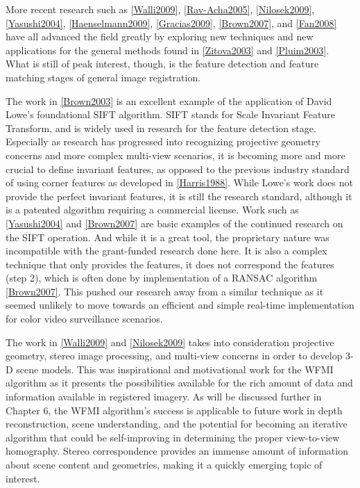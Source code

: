  More recent research such as \ref{Walli2009}, \ref{Rav-Acha2005}, \ref{Nilosek2009}, \ref{Yasushi2004}, \ref{Haenselmann2009}, \ref{Gracias2009}, \ref{Brown2007}, and \ref{Fan2008} have all advanced the field greatly by exploring new techniques and new applications for the general methods found in \ref{Zitova2003} and \ref{Pluim2003}. What is still of peak interest, though, is the feature detection and feature matching stages of general image registration.
 
  The work in \ref{Brown2003} is an excellent example of the application of David Lowe's foundational SIFT algorithm. SIFT stands for Scale Invariant Feature Transform, and is widely used in research for the feature detection stage. Especially as research has progressed into recognizing projective geometry concerns and more complex multi-view scenarios, it is becoming more and more crucial to define invariant features, as opposed to the previous industry standard of using corner features as developed in \ref{Harris1988}. While Lowe's work does not provide the perfect invariant features, it is still the research standard, although it is a patented algorithm requiring a commercial license. Work such as \ref{Yasushi2004} and \ref{Brown2007} are basic examples of the continued research on the SIFT operation. And while it is a great tool, the proprietary nature was incompatible with the grant-funded research done here. It is also a complex technique that only provides the features, it does not correspond the features (step 2), which is often done by implementation of a RANSAC algorithm \ref{Brown2007}. This pushed our research away from a similar technique as it seemed unlikely to move towards an efficient and simple real-time implementation for color video surveillance scenarios.
  
  The work in \ref{Walli2009} and \ref{Nilosek2009} takes into consideration projective geometry, stereo image processing, and multi-view concerns in order to develop 3-D scene models. This was inspirational and motivational work for the WFMI algorithm as it presents the possibilities available for the rich amount of data and information available in registered imagery. As will be discussed further in Chapter 6, the WFMI algorithm's success is applicable to future work in depth reconstruction, scene understanding, and the potential for becoming an iterative algorithm that could be self-improving in determining the proper view-to-view homography. Stereo correspondence provides an immense amount of information about scene content and geometries, making it a quickly emerging topic of interest.
  
